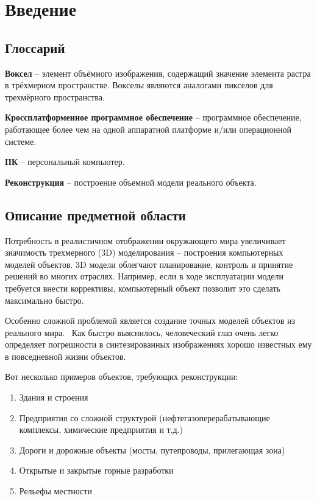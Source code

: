\section{Введение}

\subsection{Глоссарий}
\textbf{Воксел} -- элемент объёмного изображения, содержащий значение элемента растра в трёхмерном пространстве. Вокселы являются аналогами пикселов для трехмёрного пространства.~\cite{wiki_voxel}

\textbf{Кроссплатформенное программное обеспечение} -- программное обеспечение, работающее более чем на одной аппаратной платформе и/или операционной системе.~\cite{wiki_crossplatfom}

\textbf{ПК} -- персональный компьютер.

\textbf{Реконструкция} -- построение объемной модели реального объекта.

\subsection{Описание предметной области}
Потребность в реалистичном отображении окружающего мира увеличивает значимость трехмерного (3D) моделирования -- построения компьютерных моделей объектов. 3D модели облегчают планирование, контроль и принятие решений во многих отраслях. Например, если в ходе эксплуатации модели требуется внести коррективы, компьютерный объект позволит это сделать максимально быстро.

Особенно сложной проблемой является создание точных моделей объектов из реального мира.~\cite{komarova_voxel_coloring} Как быстро выяснилось, человеческий глаз очень легко определяет погрешности в синтезированных изображениях хорошо известных ему в повседневной жизни объектов.

Вот несколько примеров объектов, требующих реконструкции:
\begin{enumerate}
\item Здания и строения
\item Предприятия со сложной структурой (нефтегазоперерабатывающие комплексы, химические предприятия и т.д.)
\item Дороги и дорожные объекты (мосты, путепроводы, прилегающая зона)
\item Открытые и закрытые горные разработки
\item Рельефы местности
\end{enumerate}

